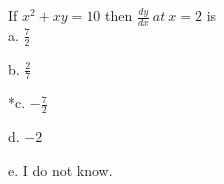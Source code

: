 
If \( x^{2} + xy = 10 \) then
\( \frac{dy}{dx}\ at\ x = 2 \) is\\

a. \( \frac{ 7 }{ 2 } \)

b. \( \frac{ 2 }{ 7 } \)

*c. \( - \frac{ 7 }{ 2 } \)

d. \( - 2 \)

e. I do not know.\\
